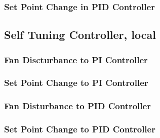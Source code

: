 \subsubsection{Set Point Change in PID Controller}
\begin{code}

\end{code}



\subsection{Self Tuning Controller, local}\label{selfcode_local}
\subsubsection{Fan Discturbance to PI Controller}
\begin{code}

\end{code}


\subsubsection{Set Point Change to PI Controller}
\begin{code}

\end{code}

\subsubsection{Fan Disturbance to PID Controller}
\begin{code}

\end{code}

\subsubsection{Set Point Change to PID Controller}
\begin{code}

\end{code}






